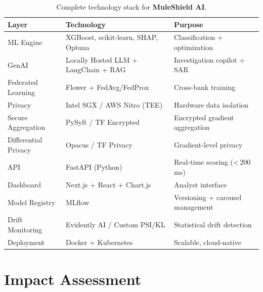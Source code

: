\documentclass[11pt, a4paper]{article}
\newcommand{\muleshield}{\textbf{\textcolor{mainblue}{MuleShield AI}}}
\begin{document}
\begin{table}[H]
\centering
\small
{}
\begin{tabularx}{\textwidth}{L{3.5cm} Y Y}
\toprule
{}
\textbf{Layer} & \textbf{Technology} & \textbf{Purpose} \\
\midrule
ML Engine & XGBoost, scikit-learn, SHAP, Optuna & Classification + optimization \\
GenAI & Locally Hosted LLM + LangChain + RAG & Investigation copilot + SAR \\
Federated Learning & Flower + FedAvg/FedProx & Cross-bank training \\
Privacy & Intel SGX / AWS Nitro (TEE) & Hardware data isolation \\
Secure Aggregation & PySyft / TF Encrypted & Encrypted gradient aggregation \\
Differential Privacy & Opacus / TF Privacy & Gradient-level privacy \\
API & FastAPI (Python) & Real-time scoring ({<}\,200\,ms) \\
Dashboard & Next.js + React + Chart.js & Analyst interface \\
Model Registry & MLflow & Versioning + carousel management \\
Drift Monitoring & Evidently AI / Custom PSI/KL & Statistical drift detection \\
Deployment & Docker + Kubernetes & Scalable, cloud-native \\
\bottomrule
\end{tabularx}
\caption{Complete technology stack for \muleshield{}.}
\end{table}


\section{Impact Assessment}
\end{document}

